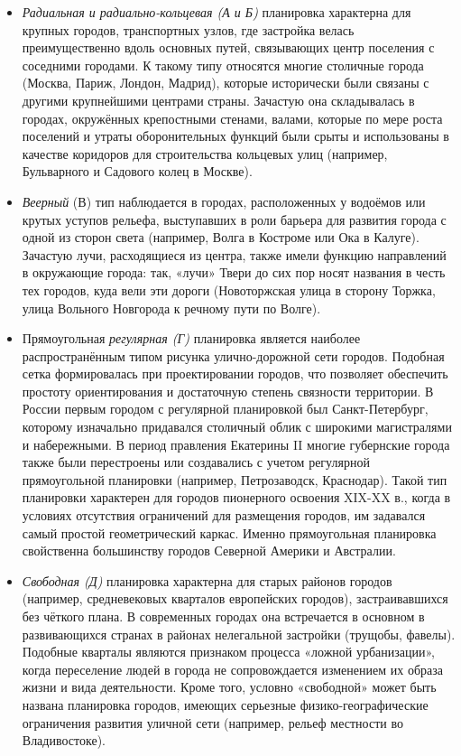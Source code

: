 \documentclass[
  11pt,
  russian,
]{book}
\begin{document}
\begin{itemize}
\item
  \emph{Радиальная и радиально-кольцевая (А и Б)} планировка характерна для крупных городов, транспортных узлов, где застройка велась преимущественно вдоль основных путей, связывающих центр поселения с соседними городами. К такому типу относятся многие столичные города (Москва, Париж, Лондон, Мадрид), которые исторически были связаны с другими крупнейшими центрами страны. Зачастую она складывалась в городах, окружённых крепостными стенами, валами, которые по мере роста поселений и утраты оборонительных функций были срыты и использованы в качестве коридоров для строительства кольцевых улиц (например, Бульварного и Садового колец в Москве).
\item
  \emph{Веерный} (В) тип наблюдается в городах, расположенных у водоёмов или крутых уступов рельефа, выступавших в роли барьера для развития города с одной из сторон света (например, Волга в Костроме или Ока в Калуге). Зачастую лучи, расходящиеся из центра, также имели функцию направлений в окружающие города: так, «лучи» Твери до сих пор носят названия в честь тех городов, куда вели эти дороги (Новоторжская улица в сторону Торжка, улица Вольного Новгорода к речному пути по Волге).
\item
  Прямоугольная \emph{регулярная (Г)} планировка является наиболее распространённым типом рисунка улично-дорожной сети городов. Подобная
  сетка формировалась при проектировании городов, что позволяет обеспечить
  простоту ориентирования и достаточную степень связности территории. В России
  первым городом с регулярной планировкой был Санкт-Петербург, которому
  изначально придавался столичный облик с широкими магистралями и набережными. В период правления Екатерины II многие губернские
  города также были перестроены или создавались с учетом регулярной прямоугольной планировки (например, Петрозаводск, Краснодар). Такой тип планировки характерен для городов пионерного освоения XIX-XX в., когда в условиях отсутствия ограничений для размещения городов, им задавался самый простой геометрический каркас. Именно прямоугольная планировка свойственна большинству городов Северной Америки и Австралии.
\item
  \emph{Свободная (Д)} планировка характерна для старых районов городов (например, средневековых кварталов европейских городов), застраивавшихся без чёткого плана. В современных городах она встречается в основном в развивающихся странах в районах нелегальной застройки (трущобы, фавелы). Подобные кварталы являются признаком процесса «ложной урбанизации», когда переселение людей в города не сопровождается изменением их образа жизни и вида деятельности. Кроме того, условно «свободной» может быть названа планировка городов, имеющих серьезные физико-географические ограничения развития уличной сети (например, рельеф местности во Владивостоке).
\end{itemize}
\end{document}

